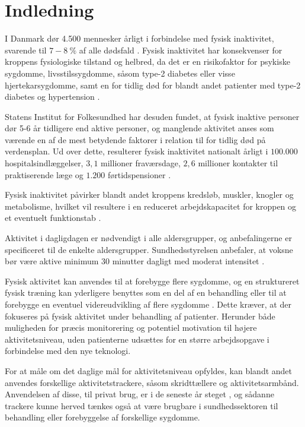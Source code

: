 \chapter{Indledning} \label{sec:indledning}
I Danmark dør 4.500 mennesker årligt i forbindelse med fysisk inaktivitet, svarende til $7-8~\%$ af alle dødsfald \citep{aagaard2014}. Fysisk inaktivitet har konsekvenser for kroppens fysiologiske tilstand og helbred, da det er en risikofaktor for psykiske sygdomme, livsstilssygdomme, såsom type-2 diabetes eller visse hjertekarsygdomme, samt en for tidlig død for blandt andet patienter med type-2 diabetes og hypertension \citep{motionsraad2007}. 

Statens Institut for Folkesundhed har desuden fundet, at fysisk inaktive personer dør 5-6 år tidligere end aktive personer, og manglende aktivitet anses som værende en af de mest betydende faktorer i relation til for tidlig død på verdensplan. Ud over dette, resulterer fysisk inaktivitet nationalt årligt i $100.000$ hospitalsindlæggelser, $3,1$ millioner fraværsdage, $2,6$ millioner kontakter til praktiserende læge og $1.200$ førtidspensioner \citep{christensen2012}.

Fysisk inaktivitet påvirker blandt andet kroppens kredsløb, muskler, knogler og metabolisme, hvilket vil resultere i en reduceret arbejdskapacitet for kroppen og et eventuelt funktionstab \citep{motionsraad2007}.

Aktivitet i dagligdagen er nødvendigt i alle aldersgrupper, og anbefalingerne er specificeret til de enkelte aldersgrupper. Sundhedsstyrelsen anbefaler, at voksne bør være aktive minimum 30 minutter dagligt med moderat intensitet \citep{pedersen2011}.

Fysisk aktivitet kan anvendes til at forebygge flere sygdomme, og en struktureret fysisk træning kan yderligere benyttes som en del af en behandling eller til at forebygge en eventuel videreudvikling af flere sygdomme \citep{motionsraad2007}. Dette kræver, at der fokuseres på fysisk aktivitet under behandling af patienter. Herunder både muligheden for præcis monitorering og potentiel motivation til højere aktivitetsniveau, uden patienterne udsættes for en større arbejdsopgave i forbindelse med den nye teknologi.

For at måle om det daglige mål for aktivitetsniveau opfyldes, kan blandt andet anvendes forskellige aktivitetstrackere, såsom skridttællere og aktivitetsarmbånd. Anvendelsen af disse, til privat brug, er i de seneste år steget \citep{statista2016}, og sådanne trackere kunne herved tænkes også at være brugbare i sundhedssektoren til behandling eller forebyggelse af forskellige sygdomme.

